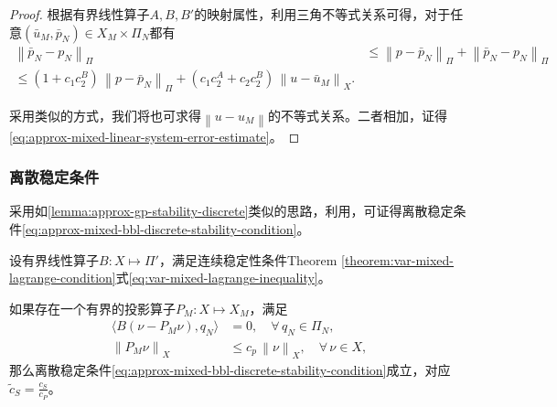 \begin{proof}
  根据有界线性算子$A,B,B'$的映射属性，利用三角不等式关系可得，对于任意$\left( \bar{u}_{M}, \bar{p}_{N} \right) \in X_{M} \times \Pi_{N}$都有
  \begin{equation*}
    \begin{split}
      \left\| \bar{p}_{N} - p_{N} \right\|_{\Pi}
      & \le \left\| p - \bar{p}_{N} \right\|_{\Pi} +
      \left\| \bar{p}_{N} - p_{N} \right\|_{\Pi} \\
      \le \left( 1 + c_{1} c_{2}^{B} \right) \,
      \left\| p - \bar{p}_{N} \right\|_{\Pi} +
      \left( c_{1} c_{2}^{A} + c_{2} c_{2}^{B} \right) \,
      \left\| u - \bar{u}_{M} \right\|_{X}.
    \end{split}
  \end{equation*}

  采用类似的方式，我们将也可求得$\left\| u - u_{M} \right\|$的不等式关系。二者相加，证得\eqref{eq:approx-mixed-linear-system-error-estimate}。
\end{proof}

\subsubsection{离散稳定条件}
\label{sec:approx-mixed-bbl-prove}

采用如\eqref{lemma:approx-gp-stability-discrete}类似的思路，利用\cite{Fortin:1977vh}，可证得离散稳定条件\eqref{eq:approx-mixed-bbl-discrete-stability-condition}。

\begin{lemma}[离散稳定条件的证明]
\label{lemma:approx-mixed-bbl-prove}
设有界线性算子$B: X \mapsto \Pi'$，满足连续稳定性条件Theorem \ref{theorem:var-mixed-lagrange-condition}式\ref{eq:var-mixed-lagrange-inequality}。

如果存在一个有界的投影算子$P_{M}: X \mapsto X_{M}$，满足
\begin{equation*}
  \begin{split}
    \langle B \left( \nu - P_{M} \nu \right) , q_{N} \rangle & = 0, \quad \forall \, q_{N} \in \Pi_{N}, \\
    \left\| P_{M} \nu \right\|_{X} & \le c_{p} \, \left\| \nu \right\|_{X}, \quad \forall \, \nu \in X,
  \end{split}
\end{equation*}
那么离散稳定条件\eqref{eq:approx-mixed-bbl-discrete-stability-condition}成立，对应$\tilde{c}_{S} = \frac{c_{S}}{c_{P}}$。
\end{lemma}


